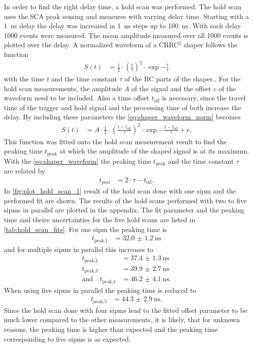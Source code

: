 In order to find the right delay time, a hold scan was performed. 
The hold scan uses the SCA peak sensing and measures with varying delay time. 
Starting with a \SI{1}{\nano\second} delay the delay was increased in \SI{1}{\nano\second} steps up to \SI{100}{\nano\second}. 
With each delay 1000 events were measured. 
The mean amplitude measured over all 1000 events is plotted over the delay.
A normalized waveform of a CRRC$^2$ shaper follows the function
\begin{align}
	S(t)&=\frac{1}{2}\cdot\left(\frac{t}{\tau}\right)^2\cdot\exp{-\frac{t}{\tau}}\label{eq:shaper_waveform_norm}
\end{align}
with the time $t$ and the time constant $\tau$ of the RC parts of the shaper.\cite{Kolanowsky}.
For the hold scan measurements, the amplitude $A$ of the signal and the offset $c$ of the waveform need to be included.
Also a time offset $t_\text{off}$ is necessary, since the travel time of the trigger and hold signal and the processing time of both increase the delay.
By including these parameters the \autoref{eq:shaper_waveform_norm} becomes
\begin{align}
	S(t)&=A\cdot\frac{1}{2}\cdot\left(\frac{t-t_\text{off}}{\tau}\right)^2\cdot\exp{-\frac{t-t_\text{off}}{\tau}}+c.\label{eq:shaper_waveform}
\end{align}
This function was fitted onto the hold scan measurement result to find the peaking time $t_\text{peak}$ at which the amplitude of the shaped signal is at its maximum.
With the \autoref{eq:shaper_waveform} the peaking time $t_\text{peak}$ and the time constant $\tau$ are related by
\begin{align}
	t_\text{peal}&=2\cdot\tau-t_\text{off}.
\end{align}
In \autoref{fig:plot_hold_scan_1} result of the hold scan done with one \ac{sipm} and the performed fit are shown.
The results of the hold scans performed with two to five \ac{sipm}s in parallel are plotted in the appendix. 
The fit parameter and the peaking time and theire uncertainties for the five hold scans are listed in \autoref{tab:hold_scan_fits}.
For one \ac{sipm} the peaking time is 
\begin{align}
	t_\text{peak,1}&=\SI{32.0(12)}{\nano\second}
\end{align}
and for multiple \ac{sipm}s in parallel this increases to
\begin{align}
	t_\text{peak,2}&=\SI{37.4(13)}{\nano\second}\\
	t_\text{peak,3}&=\SI{39.9(27)}{\nano\second}\\
	\text{and}\quad t_\text{peak,4}&=\SI{46.2(41)}{\nano\second}.
\end{align}
When using five \ac{sipm}s in parallel the peaking time is reduced to 
\begin{align}
	t_\text{peak,5}&=\SI{44.3(29)}{\nano\second}.
\end{align}
Since the hold scan done with four \ac{sipm}s lead to the fitted offset parameter to be much lower compared to the other measurements, it is likely, that for unknown reasons, the peaking time is higher than expected and the peaking time corresponding to five \ac{sipm}s is as expected.


